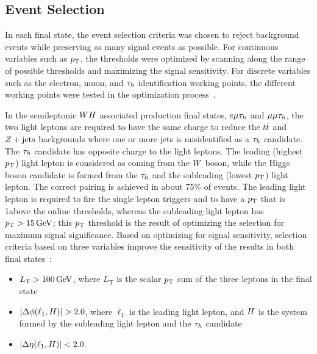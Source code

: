 


\subsection{Event Selection}
\label{sec:vh_evt_selection}
In each final state, the event selection criteria was chosen to reject background
events while preserving as many signal events as possible. For continuous variables such as
$p_\mathrm{T}$, the thresholds were optimized by scanning along the range of possible thresholds
and maximizing the signal sensitivity. For discrete variables such as the electron,
muon, and $\tau_{h}$ identification working points, the different working points were
tested in the optimization process~\cite{HIG-18-007}.

In the semileptonic $WH$ associated production final states, $e\mu\tau_{h}$ and 
$\mu\mu\tau_{h}$,
the two light leptons are required to have the same charge to reduce the $t\bar{t}$ 
and $Z+\textrm{jets}$ backgrounds where one or more jets is misidentified as a $\tau_{h}$ 
candidate. The $\tau_{h}$ candidate has opposite charge to the light leptons. The leading (highest $p_\mathrm{T}$)
light lepton is considered as coming from the $W$ boson, while the Higgs boson 
candidate is formed from the $\tau_{h}$ and the subleading (lowest $p_\mathrm{T}$) light lepton. The 
correct pairing is achieved in about 75\% of events. The leading light lepton is required 
to fire the single lepton triggers and to have a $p_\mathrm{T}$ that is 1\GeV above the online 
thresholds, whereas the subleading light lepton has $p_\mathrm{T}>15\,\mathrm{GeV}$; this $p_\mathrm{T}$ threshold
is the result of optimizing the selection for maximum signal significance. 
Based on optimizing for signal sensitivity, selection criteria based 
on three variables improve the sensitivity of the results in both final states~\cite{HIG-18-007}:
\begin{itemize}
\item $L_{\text{T}}>100\,\mathrm{GeV}$, where $L_{\text{T}}$ is the scalar $p_\mathrm{T}$ sum of the three leptons in the final state
\item $\lvert\Delta\phi(\ell_1,H)\rvert>2.0$, where $\ell_1$ is the leading light lepton, and 
$H$ is the system formed by the subleading light lepton and the $\tau_{h}$ candidate
\item $\lvert\Delta\eta(\ell_1,H)\rvert<2.0$.
\end{itemize}


